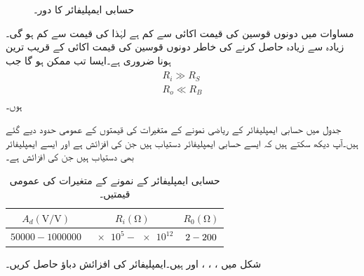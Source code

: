 \begin{figure}
\centering
{}
\caption{حسابی ایمپلیفائر کا دور۔}
\label{شکل_حسابی_ایمپلیفائر_دور_الف}
\end{figure}

مساوات  میں دونوں قوسین کی قیمت اکائی سے کم ہے لہٰذا  کی قیمت  سے کم ہو گی۔زیادہ سے زیادہ  حاصل کرنے کی خاطر دونوں قوسین کی قیمت اکائی کے قریب ترین ہونا ضروری ہے۔ایسا تب ممکن ہو گا جب
\begin{gather}
\begin{aligned}
R_i \gg R_S\\
R_o \ll R_B
\end{aligned}
\end{gather}
ہوں۔

جدول  میں حسابی ایمپلیفائر کے ریاضی نمونے کے متغیرات کی قیمتوں کے عمومی حدود دیے گئے ہیں۔آپ دیکھ سکتے ہیں کہ ایسے حسابی ایمپلیفائر دستیاب ہیں جن کی افزائش   ہے اور ایسے ایمپلیفائر بھی دستیاب ہیں جن کی افزائش  ہے۔
\begin{table} 
\caption{حسابی ایمپلیفائر کے نمونے کے متغیرات کی عمومی قیمتیں۔}
\centering
\begin{tabular}{ccc}
 $A_d (\si{\volt\per\volt})$ & $R_i (\si{\ohm})$ & $R_0 (\si{\ohm}) $\\
\hline
$\num{50000} - \num{1000000} $& $\num{e5} - \num{e12}$ & $2-200 \rule{0pt}{2.5ex} $ 
\end{tabular}
\label{جدول_حسابی_نمونہ_متغیرات}
\end{table}

شکل  میں ، ، ،  اور  ہیں۔ایمپلیفائر کی افزائش دباؤ  حاصل کریں۔


